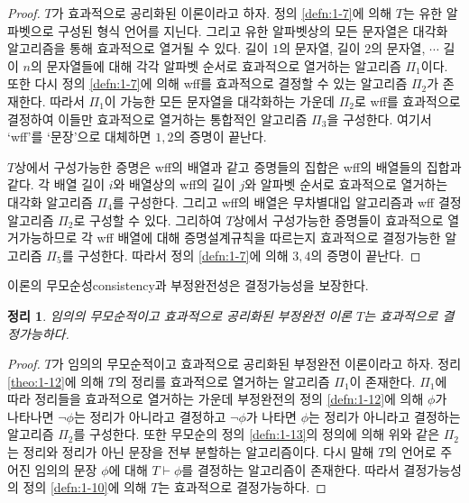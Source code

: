 \documentclass[a4paper,chapter,atbegshi]{oblivoir}
\newtheorem{theo}{정리}[chapter]
\begin{document}
\begin{proof}
  $T$가 효과적으로 공리화된 이론이라고 하자. 정의 \ref{defn:1-7}에 의해
  $T$는 유한 알파벳으로 구성된 형식 언어를 지닌다. 그리고 유한 알파벳상의
  모든 문자열은 대각화 알고리즘을 통해 효과적으로 열거될 수 있다. 길이
  $1$의 문자열, 길이 $2$의 문자열, $\cdots$ 길이 $n$의 문자열들에 대해 
  각각 알파벳 순서로 효과적으로 열거하는 알고리즘 $\Pi_1$이다. 또한 다시
  정의 \ref{defn:1-7}에 의해 wff를 효과적으로 결정할 수 있는 알고리즘
  $\Pi_2$가 존재한다. 따라서 $\Pi_1$이 가능한 모든 문자열을 대각화하는
  가운데 $\Pi_2$로 wff를 효과적으로 결정하여 이들만 효과적으로 열거하는
  통합적인 알고리즘 $\Pi_3$을 구성한다. 여기서 `wff'를 `문장'으로
  대체하면 $1,2$의 증명이 끝난다.

  $T$상에서 구성가능한 증명은 wff의 배열과 같고 증명들의 집합은 wff의
  배열들의 집합과 같다. 각 배열 길이 $i$와 배열상의 wff의 길이 $j$와
  알파벳 순서로 효과적으로 열거하는 대각화 알고리즘 $\Pi_4$를 구성한다. 
  그리고 wff의 배열은 무차별대입 알고리즘과 wff 결정 알고리즘 $\Pi_2$로
  구성할 수 있다. 그리하여 $T$상에서 구성가능한 증명들이 효과적으로 
  열거가능하므로 각 wff 배열에 대해 증명설계규칙을 따르는지 효과적으로
  결정가능한 알고리즘 $\Pi_5$를 구성한다. 따라서 정의 \ref{defn:1-7}에 의해
  $3,4$의 증명이 끝난다.
\end{proof}
이론의 무모순성{\tiny consistency}과 부정완전성은 결정가능성을 보장한다.
\begin{theo}\label{theo:1-13}
  임의의 무모순적이고 효과적으로 공리화된 부정완전 이론 $T$는 효과적으로
  결정가능하다.
\end{theo}
\begin{proof}
  $T$가 임의의 무모순적이고 효과적으로 공리화된 부정완전 이론이라고 하자.
  정리 \ref{theo:1-12}에 의해 $T$의 정리를 효과적으로 열거하는 알고리즘 $\Pi_1$이
  존재한다. $\Pi_1$에 따라 정리들을 효과적으로 열거하는 가운데 부정완전의 정의
  \ref{defn:1-12}에 의해 $\phi$가 나타나면 $\neg\phi$는 정리가
  아니라고 결정하고 $\neg\phi$가 나타면 $\phi$는 정리가 아니라고 결정하는
  알고리즘 $\Pi_2$를 구성한다. 또한 무모순의 정의 \ref{defn:1-13}의 정의에
  의해 위와 같은 $\Pi_2$는 정리와 정리가 아닌 문장을 전부 분할하는 알고리즘이다.
  다시 말해 $T$의 언어로 주어진 임의의 문장 $\phi$에 대해 $T\vdash\phi$를
  결정하는 알고리즘이 존재한다. 따라서 결정가능성의 정의 \ref{defn:1-10}에 의해
  $T$는 효과적으로 결정가능하다.
\end{proof}
\end{document}
